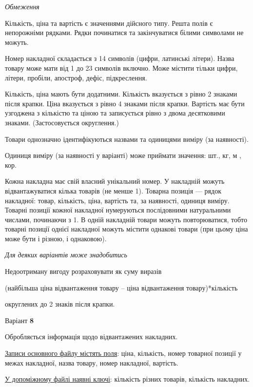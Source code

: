 \documentclass[11pt, ukrainian]{article}
\begin{document}

\bigskip\textit{Обмеження}

Кількість, ціна та вартість є значеннями дійсного типу.
Решта полів є непорожніми рядками.
Рядки починатися та закінчуватися білими символами не можуть.

Номер накладної складається з 14 символів (цифри, латинські літери).
Назва товару може мати від 1 до 23 символів включно.
Може містити тільки цифри, літери, пробіли, апостроф, дефіс, підкреслення.

Кількість, ціна мають бути додатними.
Кількість вказується з рівно 2 знаками після крапки.
Ціна вказується з рівно 4 знаками після крапки.
Вартість має бути узгоджена з кількістю та ціною та записується рівно з двома десятковими знаками.
(Застосовується округлення.)

Товари однозначно ідентифікуються назвами та одиницями виміру (за наявності).

Одиниця виміру (за наявності у варіанті) може приймати значення: шт., кг, м , кор.

Кожна накладна має свій власний унікальний номер.
У накладній можуть відвантажуватися кілька товарів (не менше 1).
Товарна позиція --- рядок накладної: товар, кількість, ціна, вартість та, за наявності, одиниця виміру.
Товарні позиції кожної накладної нумеруються послідовними натуральними числами, починаючи з 1.
В одній накладній товари можуть повторюватися, 
тобто товарні позиції однієї накладної можуть містити однакові товари 
(при цьому ціна може бути і різною, і однаковою).

\bigskip\textit{Для деяких варіантів може знадобитись}

Недоотриману вигоду розраховувати як суму виразів
{\center (найбільша ціна відвантаження товару – ціна відвантаження товару)*кількість\par}

\bigskip
{\noindent} округлених до 2 знаків після крапки.


\par
\newpage
{\center Варіант  \No \textbf { 8 }\par}
\bigskip
Обробляється інформація щодо відвантажених накладних.

\underline{Записи основного файлу містять поля}: ціна, кількість, номер товарної позиції у межах накладної, назва товару, номер накладної, вартість.

\underline{У допоміжному файлі наявні ключі}: кількість різних товарів, кількість накладних.
\end{document}
